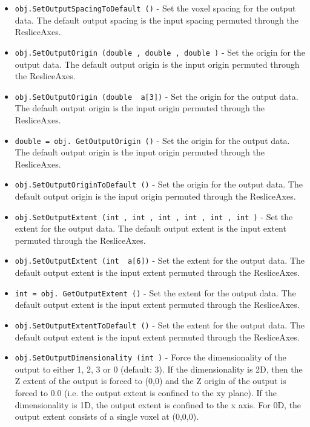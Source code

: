 \begin{itemize}
\item  \verb|obj.SetOutputSpacingToDefault ()| -  Set the voxel spacing for the output data.  The default output
 spacing is the input spacing permuted through the ResliceAxes.

\item  \verb|obj.SetOutputOrigin (double , double , double )| -  Set the origin for the output data.  The default output origin
 is the input origin permuted through the ResliceAxes.

\item  \verb|obj.SetOutputOrigin (double  a[3])| -  Set the origin for the output data.  The default output origin
 is the input origin permuted through the ResliceAxes.

\item  \verb|double = obj. GetOutputOrigin ()| -  Set the origin for the output data.  The default output origin
 is the input origin permuted through the ResliceAxes.

\item  \verb|obj.SetOutputOriginToDefault ()| -  Set the origin for the output data.  The default output origin
 is the input origin permuted through the ResliceAxes.

\item  \verb|obj.SetOutputExtent (int , int , int , int , int , int )| -  Set the extent for the output data.  The default output extent
 is the input extent permuted through the ResliceAxes.

\item  \verb|obj.SetOutputExtent (int  a[6])| -  Set the extent for the output data.  The default output extent
 is the input extent permuted through the ResliceAxes.

\item  \verb|int = obj. GetOutputExtent ()| -  Set the extent for the output data.  The default output extent
 is the input extent permuted through the ResliceAxes.

\item  \verb|obj.SetOutputExtentToDefault ()| -  Set the extent for the output data.  The default output extent
 is the input extent permuted through the ResliceAxes.

\item  \verb|obj.SetOutputDimensionality (int )| -  Force the dimensionality of the output to either 1, 2,
 3 or 0 (default: 3).  If the dimensionality is 2D, then
 the Z extent of the output is forced to (0,0) and the Z
 origin of the output is forced to 0.0 (i.e. the output
 extent is confined to the xy plane).  If the dimensionality
 is 1D, the output extent is confined to the x axis.  
 For 0D, the output extent consists of a single voxel at 
 (0,0,0).


\end{itemize}
